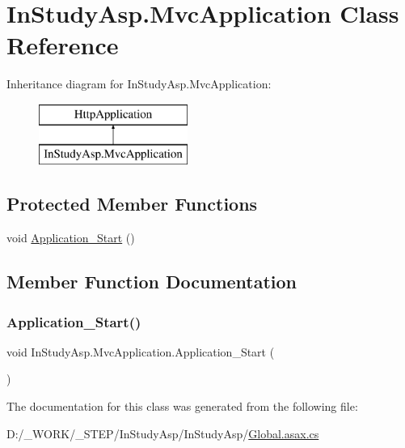 \hypertarget{class_in_study_asp_1_1_mvc_application}{}\section{In\+Study\+Asp.\+Mvc\+Application Class Reference}
\label{class_in_study_asp_1_1_mvc_application}
Inheritance diagram for In\+Study\+Asp.\+Mvc\+Application\+:\begin{figure}[H]
\begin{center}
\leavevmode
\includegraphics[height=2.000000cm]{class_in_study_asp_1_1_mvc_application}
\end{center}
\end{figure}
\subsection*{Protected Member Functions}
\begin{DoxyCompactItemize}
\item 
void \hyperlink{class_in_study_asp_1_1_mvc_application_aa30bba9d99d413301ced2c1fe641ab7a}{Application\+\_\+\+Start} ()
\end{DoxyCompactItemize}


\subsection{Member Function Documentation}
\mbox{\label{class_in_study_asp_1_1_mvc_application_aa30bba9d99d413301ced2c1fe641ab7a}} 
\subsubsection{\texorpdfstring{Application\+\_\+\+Start()}{Application\_Start()}}
{\footnotesize\ttfamily void In\+Study\+Asp.\+Mvc\+Application.\+Application\+\_\+\+Start (\begin{DoxyParamCaption}{ }\end{DoxyParamCaption})\hspace{0.3cm}{\ttfamily [protected]}}



The documentation for this class was generated from the following file\+:\begin{DoxyCompactItemize}
\item 
D\+:/\+\_\+\+W\+O\+R\+K/\+\_\+\+S\+T\+E\+P/\+In\+Study\+Asp/\+In\+Study\+Asp/\hyperlink{_global_8asax_8cs}{Global.\+asax.\+cs}\end{DoxyCompactItemize}
